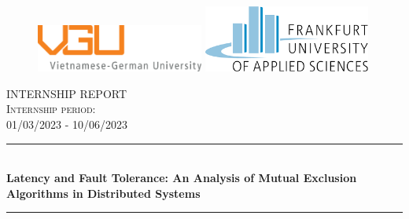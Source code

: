 \begin{titlepage}

\newcommand{\HRule}{\rule{\linewidth}{0.5mm}} %

\begin{figure}
    \centering
    \includegraphics[width=5.5cm]{./title/Logo20.png}
    \hspace{1cm}
    \includegraphics[width=5.5cm]{./title/fra_uas_logo.png}
\end{figure}



 

\center %


\textsc{\LARGE INTERNSHIP REPORT}\\[1.5cm] 
\textsc{\Large Internship period:}\\[0.5cm] 
\textsc{\large 01/03/2023 - 10/06/2023}\\[0.5cm] 

\makeatletter
\HRule \\[0.6cm]
{ \huge \bfseries Latency and Fault Tolerance: An Analysis of Mutual Exclusion Algorithms in Distributed Systems}\\[0.2cm] %
\HRule \\[1.5cm]
 

\end{titlepage}
